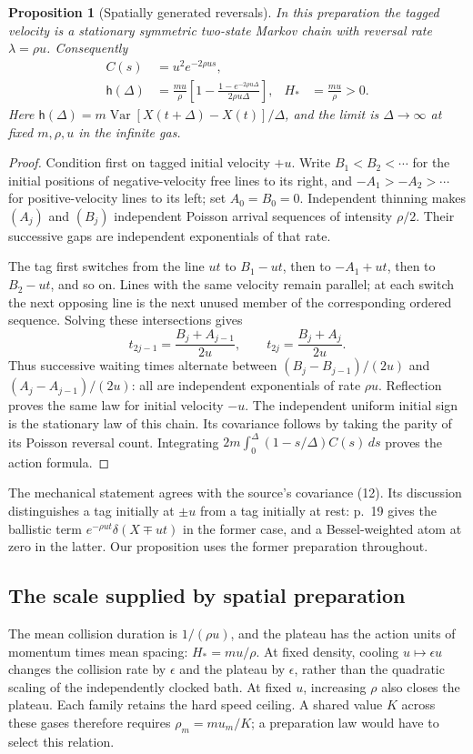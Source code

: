 \documentclass[11pt,a4paper]{article}
\newtheorem{proposition}{Proposition}
\newcommand{\Var}{\operatorname{Var}}
\begin{document}
\begin{proposition}[Spatially generated reversals]\label{prop:spatial}
In this preparation the tagged velocity is a stationary symmetric two-state
Markov chain with reversal rate $\lambda=\rho u$. Consequently
\begin{align}
 C(s)&=u^2e^{-2\rho u s},\\
 \mathsf h(\Delta)&=\frac{mu}{\rho}
 \left[1-\frac{1-e^{-2\rho u\Delta}}{2\rho u\Delta}\right],
 & H_*&=\frac{mu}{\rho}>0.
 \label{eq:spatial-plateau}
\end{align}
Here $\mathsf h(\Delta)=m\Var[X(t+\Delta)-X(t)]/\Delta$,
and the limit is $\Delta\to\infty$ at fixed $m,\rho,u$ in the infinite gas.
\end{proposition}
\begin{proof}
Condition first on tagged initial velocity $+u$. Write $B_1<B_2<\cdots$
for the initial positions of negative-velocity free lines to its right, and
$-A_1>-A_2>\cdots$ for positive-velocity lines to its left; set $A_0=B_0=0$.
Independent thinning makes $(A_j)$ and $(B_j)$ independent Poisson arrival
sequences of intensity $\rho/2$. Their successive gaps are independent
exponentials of that rate.

The tag first switches from the line $ut$ to $B_1-ut$, then to $-A_1+ut$,
then to $B_2-ut$, and so on. Lines with the same velocity remain parallel;
at each switch the next opposing line is the next unused member of the
corresponding ordered sequence. Solving these intersections gives
\[
 t_{2j-1}=\frac{B_j+A_{j-1}}{2u},\qquad
 t_{2j}=\frac{B_j+A_j}{2u}.
\]
Thus successive waiting times alternate between
$(B_j-B_{j-1})/(2u)$ and $(A_j-A_{j-1})/(2u)$: all are independent
exponentials of rate $\rho u$. Reflection proves the same law for initial
velocity $-u$. The independent uniform initial sign is the stationary law
of this chain. Its covariance follows by taking the parity of its Poisson
reversal count. Integrating
$2m\int_0^\Delta(1-s/\Delta)C(s)\,ds$ proves the action formula.
\end{proof}

The mechanical statement agrees with the source's covariance (12). Its
discussion distinguishes a tag initially at $\pm u$ from a tag initially at
rest: p.~19 gives the ballistic term $e^{-\rho ut}\delta(X\mp ut)$ in the
former case, and a Bessel-weighted atom at zero in the latter. Our proposition
uses the former preparation throughout.

\subsection{The scale supplied by spatial preparation}
The mean collision duration is $1/(\rho u)$, and the plateau has the
action units of momentum times mean spacing: $H_*=mu/\rho$.
At fixed density, cooling $u\mapsto\epsilon u$ changes the collision rate
by $\epsilon$ and the plateau by $\epsilon$, rather than the quadratic
scaling of the independently clocked bath. At fixed $u$, increasing
$\rho$ also closes the plateau. Each family retains the hard speed ceiling.
A shared value $K$ across these gases therefore requires
$\rho_m=mu_m/K$; a preparation law would have to select this relation.
\end{document}
